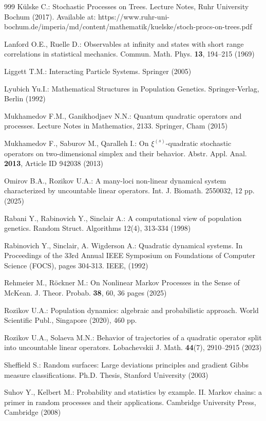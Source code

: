 \documentclass[11pt,reqno]{amsart}
\numberwithin{equation}{section} \setcounter{tocdepth}{1}
\begin{document}
\begin{thebibliography}{999}
 K\"ulske C.: Stochastic Processes on Trees. Lecture Notes, Ruhr University Bochum (2017). 
Available at: https://www.ruhr-uni-bochum.de/imperia/md/content/mathematik/kuelske/stoch-procs-on-trees.pdf

 Lanford O.E., Ruelle D.: Observables at infinity and states with short range correlations in statistical mechanics. 
Commun. Math. Phys. \textbf{13}, 194--215 (1969)

 Liggett T.M.: Interacting Particle Systems. 
Springer (2005)

 Lyubich Yu.I.: Mathematical Structures in Population Genetics. 
Springer-Verlag, Berlin (1992)

 Mukhamedov F.M., Ganikhodjaev N.N.: Quantum quadratic operators and processes. 
Lecture Notes in Mathematics, 2133. Springer, Cham (2015)

 Mukhamedov F., Saburov M., Qaralleh I.: On $\xi^{(s)}$-quadratic stochastic operators on two-dimensional simplex and their behavior. 
Abstr. Appl. Anal. \textbf{2013}, Article ID 942038 (2013)

 Omirov B.A., Rozikov U.A.: A many-loci non-linear dynamical system characterized by uncountable linear operators. 
Int. J. Biomath. 2550032, 12 pp. (2025)

 Rabani Y., Rabinovich Y., Sinclair A.: A computational view of population genetics. Random Struct. Algorithms 12(4), 313-334 (1998)

 Rabinovich Y., Sinclair, A. Wigderson A.: Quadratic dynamical systems. In Proceedings of the 33rd Annual IEEE Symposium on Foundations of Computer Science (FOCS), pages 304-313. IEEE, (1992)

 Rehmeier M., R\"ockner M.: On Nonlinear Markov Processes in the Sense of McKean. 
J. Theor. Probab. \textbf{38}, 60, 36 pages (2025)

 Rozikov U.A.: Population dynamics: algebraic and probabilistic approach. 
World Scientific Publ., Singapore (2020), 460 pp.

 Rozikov U.A., Solaeva M.N.: Behavior of trajectories of a quadratic operator split into uncountable linear operators. 
Lobachevskii J. Math. \textbf{44}(7), 2910--2915 (2023)


 Sheffield S.: Random surfaces: Large deviations principles and gradient Gibbs measure classifications. 
Ph.D. Thesis, Stanford University (2003)

 Suhov Y., Kelbert M.: Probability and statistics by example. II. Markov chains: a primer in random processes and their applications. 
Cambridge University Press, Cambridge (2008)
\end{thebibliography}
\end{document}
